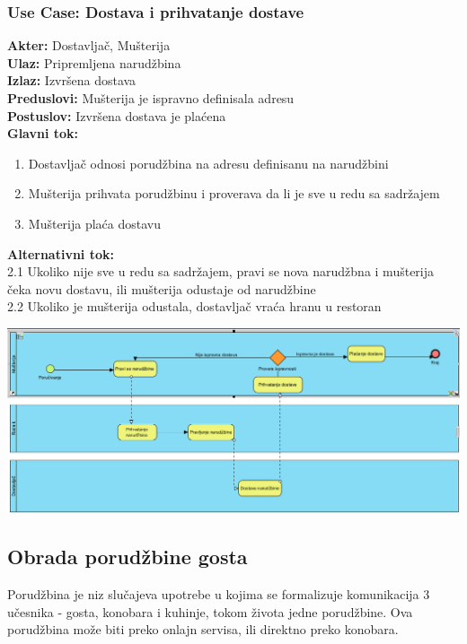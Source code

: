 \documentclass{article}
\begin{document}
       
\subsubsection{\textbf{Use Case}: Dostava i prihvatanje dostave}
\textbf{Akter:} Dostavljač, Mušterija\\
\textbf{Ulaz:} Pripremljena narudžbina\\
\textbf{Izlaz:} Izvršena dostava\\
\textbf{Preduslovi:} Mušterija je ispravno definisala adresu\\
\textbf{Postuslov:}  Izvršena dostava je plaćena\\
\textbf{Glavni tok:}
\begin{enumerate}
\item Dostavljač odnosi porudžbina na adresu definisanu na narudžbini
\item Mušterija prihvata porudžbinu i proverava da li je sve u redu sa sadržajem
\item Mušterija plaća dostavu
\end{enumerate}
\textbf{Alternativni tok:}\\
       2.1 Ukoliko nije sve u redu sa sadržajem, pravi se nova narudžbna i mušterija čeka novu dostavu, ili mušterija odustaje od narudžbine\\
       2.2 Ukoliko je mušterija odustala, dostavljač vraća hranu u restoran

\includegraphics[width=\textwidth]{SU_6_dostava_bpmn.png}


\subsection {Obrada porudžbine gosta}

Porudžbina je niz slučajeva upotrebe u kojima se formalizuje komunikacija 3 učesnika - gosta, konobara i kuhinje, tokom života jedne porudžbine. Ova porudžbina može biti preko onlajn servisa, ili direktno preko konobara.
\end{document}

